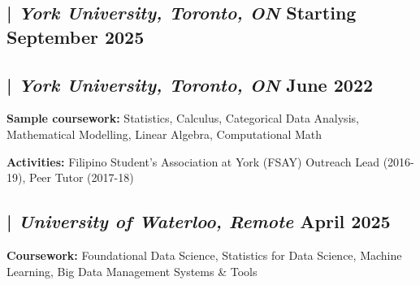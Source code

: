 
\subsection{ | \textit{York University, Toronto, ON}	\hfill Starting September 2025}
\subsection{ | \textit{York University, Toronto, ON} \hfill	June 2022}
\begin{zitemize}
\item \textbf{Sample coursework:}  Statistics, Calculus, Categorical Data Analysis, Mathematical Modelling, Linear Algebra, Computational Math
\item \textbf{Activities:}  Filipino Student’s Association at York (FSAY) Outreach Lead (2016-19), Peer Tutor (2017-18)
\end{zitemize}
\vfill
\subsection{ | \textit{University of Waterloo, Remote} \hfill	April 2025}
\begin{zitemize}
\item \textbf{Coursework:}  Foundational Data Science, Statistics for Data Science, Machine Learning, Big Data Management Systems \& Tools
\end{zitemize}



